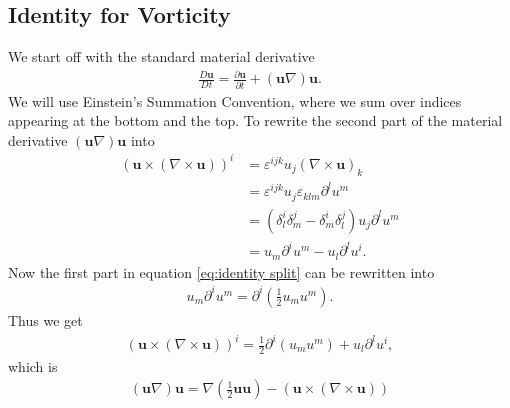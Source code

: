 \subsection{Identity for Vorticity}
\label{appendix:diff identity}
We start off with the standard material derivative
\begin{align}
    \frac{D\mathbf{u}}{Dt} = \frac{\partial \mathbf{u}}{\partial t}
    +(\mathbf{u}\nabla)\mathbf{u}.
\end{align}
We will use Einstein's Summation Convention, where we sum over indices
appearing at the bottom and the top. To rewrite the second part of the
material derivative $(\mathbf{u}\nabla)\mathbf{u}$ into
\begin{align}
    (\mathbf{u}\times (\nabla \times \mathbf{u}))^i
    &= \varepsilon^{ijk}u_j(\nabla \times  \mathbf{u})_k \\
    &= \varepsilon^{ijk}u_j\varepsilon_{klm}\partial^l u^m\\
    &=(\delta^i_l\delta^j_m-\delta^i_m\delta^j_l)u_j\partial^l u^m\\
    &=u_m\partial^i u^m - u_l \partial^l u^i.\label{eq:identity split}
\end{align}
Now the first part in equation \ref{eq:identity split} can be rewritten into
\begin{align}
    u_m\partial^i u^m =\partial^i (\frac{1}{2}u_mu^m) .
\end{align}
Thus we get
\begin{align}
    (\mathbf{u}\times (\nabla \times \mathbf{u}))^i
    = \frac{1}{2}\partial^i(u_m u^m) + u_l \partial^l u^i,
\end{align}
which is
\begin{align}
    (\mathbf{u}\nabla)\mathbf{u} = \nabla(\frac{1}{2}\mathbf{u}\mathbf{u}) -
    \left(\mathbf{u}\times (\nabla \times  \mathbf{u})\right)
\end{align}

